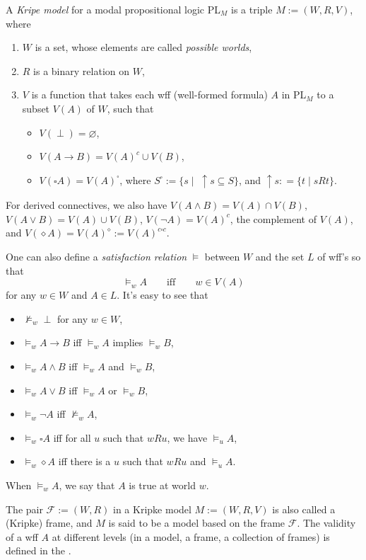 \documentclass[12pt]{article}
\begin{document}
A \emph{Kripe model} for a modal propositional logic PL$_M$ is a triple $M:=(W,R,V)$, where 
\begin{enumerate}
\item $W$ is a set, whose elements are called \emph{possible worlds},
\item $R$ is a binary relation on $W$, 
\item $V$ is a function that takes each wff (well-formed formula) $A$ in PL$_M$ to a subset $V(A)$ of $W$, such that
\begin{itemize}
\item $V(\perp)=\varnothing$,
\item $V(A\to B)=V(A)^c \cup V(B)$,
\item $V(\square A)= V(A)^{\square}$, where $S^{\square}:=\lbrace s \mid\; \uparrow\!\! s \subseteq S \rbrace$, and $\uparrow\!\! s: =\lbrace t \mid s R t\rbrace$.
\end{itemize}
\end{enumerate}
For derived connectives, we also have $V(A\land B)=V(A)\cap V(B)$, $V(A\lor B)=V(A)\cup V(B)$, $V(\neg A)=V(A)^c$, the complement of $V(A)$, and $V(\diamond A)=V(A)^{\diamond}:=V(A)^{c\square c}$.

One can also define a \emph{satisfaction relation} $\models$ between $W$ and the set $L$ of wff's so that 
$$\models_w A \qquad \mbox{iff} \qquad w\in V(A)$$
for any $w\in W$ and $A\in L$.  It's easy to see that
\begin{multicols}{2}
\begin{itemize}
\item $\not \models_w \perp$ for any $w\in W$,
\item $\models_w A\to B$ iff $\models_w A$ implies $\models_w B$,
\item $\models_w A\land B$ iff $\models_w A$ and $\models_w B$,
\item $\models_w A\lor B$ iff $\models_w A$ or $\models_w B$,
\item $\models_w \neg A$ iff $\not \models_w A$,
\item $\models_w \square A$ iff for all $u$ such that $w R u$, we have $\models_u A$,
\item $\models_w \diamond A$ iff there is a $u$ such that $w R u$ and $\models_u A$.
\end{itemize}
\end{multicols}
When $\models_w A$, we say that $A$ is true at world $w$.

The pair $\mathcal{F}:=(W,R)$ in a Kripke model $M:=(W,R,V)$ is also called a (Kripke) frame, and $M$ is said to be a model based on the frame $\mathcal{F}$.  The validity of a wff $A$ at different levels (in a model, a frame, a collection of frames) is defined in the .
\end{document}
